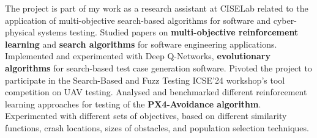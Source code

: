     \small{\newline{} The project is part of my work as a research assistant at CISELab related to the application of multi-objective search-based algorithms for software and cyber-physical systems testing.}
    \vspace{-4pt}
        \resumeItemListStart
            \subItemOfItem
            {Studied papers on \textbf{multi-objective reinforcement learning} and \textbf{search algorithms} for software engineering applications.}
            \subItemOfItem
            {Implemented and experimented with Deep Q-Networks, \textbf{evolutionary algorithms} for search-based test case generation software.}
            \subItemOfItem
            {Pivoted the project to participate in the Search-Based and Fuzz Testing ICSE’24 workshop's tool competition on UAV testing.}
            \subItemOfItem
            {Analysed and benchmarked different reinforcement learning approaches for testing of the \textbf{PX4-Avoidance algorithm}.}
            \subItemOfItem
            {Experimented with different sets of objectives, based on different similarity functions, crash locations, sizes of obstacles, and population selection techniques.}          
        \resumeItemListEnd